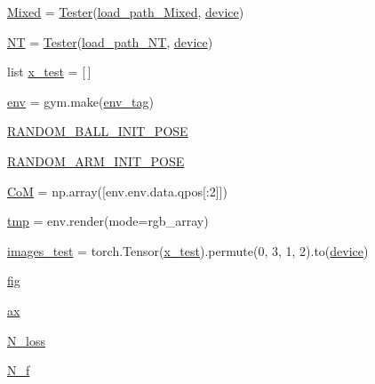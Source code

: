 \begin{DoxyCompactItemize}
\item 
\hyperlink{namespacetest___a_e_ae06080d699f7519d145e956590bdbf76}{Mixed} = \hyperlink{classtest___a_e_1_1_tester}{Tester}(\hyperlink{namespacetest___a_e_ac24fbeab7bd192f061b5ad37746b7c49}{load\+\_\+path\+\_\+\+Mixed}, \hyperlink{namespacetest___a_e_a2fe4876a8ef1d5961b3a7238a439bed4}{device})
\item 
\hyperlink{namespacetest___a_e_a23bc451321689c0ef6c1a83cd7780e72}{NT} = \hyperlink{classtest___a_e_1_1_tester}{Tester}(\hyperlink{namespacetest___a_e_a5ab7406072c5b846aedbb57d687ef841}{load\+\_\+path\+\_\+\+NT}, \hyperlink{namespacetest___a_e_a2fe4876a8ef1d5961b3a7238a439bed4}{device})
\item 
list \hyperlink{namespacetest___a_e_ae76668377d6fc202f73ebccc13d89857}{x\+\_\+test} = \mbox{[}$\,$\mbox{]}
\item 
\hyperlink{namespacetest___a_e_ab93732fc273273ff522687d5beb1907c}{env} = gym.\+make(\hyperlink{namespacetest___a_e_ad4e9f164dde3e575cfd777341ed3bacd}{env\+\_\+tag})
\item 
\hyperlink{namespacetest___a_e_ac892bd61c2ffd2c78494be3f5dee14a2}{R\+A\+N\+D\+O\+M\+\_\+\+B\+A\+L\+L\+\_\+\+I\+N\+I\+T\+\_\+\+P\+O\+SE}
\item 
\hyperlink{namespacetest___a_e_a01ed6bd3289b1e5792b49ce437660dec}{R\+A\+N\+D\+O\+M\+\_\+\+A\+R\+M\+\_\+\+I\+N\+I\+T\+\_\+\+P\+O\+SE}
\item 
\hyperlink{namespacetest___a_e_a231bc404e8f52fb98deb7b2dd6c089ae}{CoM} = np.\+array(\mbox{[}env.\+env.\+data.\+qpos\mbox{[}\+:2\mbox{]}\mbox{]})
\item 
\hyperlink{namespacetest___a_e_aee89269a4b168745cf2442a4b9f95894}{tmp} = env.\+render(mode=\textquotesingle{}rgb\+\_\+array\textquotesingle{})
\item 
\hyperlink{namespacetest___a_e_ad4d403402a170260faa8678ef573efa4}{images\+\_\+test} = torch.\+Tensor(\hyperlink{namespacetest___a_e_ae76668377d6fc202f73ebccc13d89857}{x\+\_\+test}).permute(0, 3, 1, 2).to(\hyperlink{namespacetest___a_e_a2fe4876a8ef1d5961b3a7238a439bed4}{device})
\item 
\hyperlink{namespacetest___a_e_aa94c34d93f296e05338e67fe2404636e}{fig}
\item 
\hyperlink{namespacetest___a_e_a29ea1dd7415edda21580b999e726a456}{ax}
\item 
\hyperlink{namespacetest___a_e_ad5832d650134f387c6ca57d62f7d0ec0}{N\+\_\+loss}
\item 
\hyperlink{namespacetest___a_e_af276e6307d224a71b774efc9b96e2681}{N\+\_\+f}
\item 

\end{DoxyCompactItemize}

